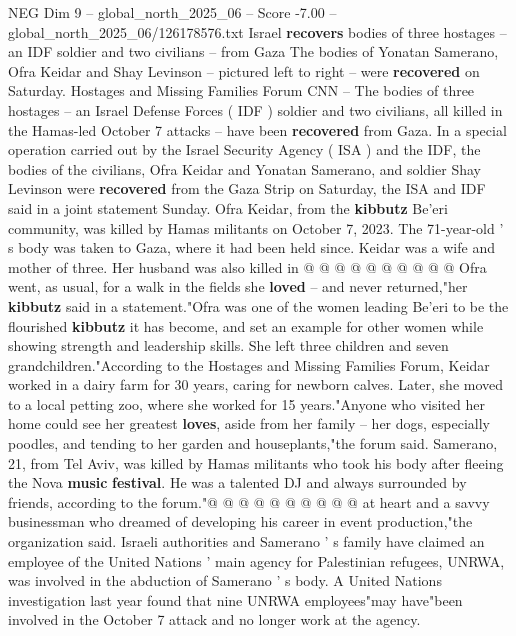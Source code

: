 \begin{textsample}{NEG Dim 9 – global\_north\_2025\_06 – Score -7.00 – global\_north\_2025\_06/126178576.txt}  \label{ex:f9_neg_095}
Israel \textbf{recovers} bodies of three hostages -- an IDF soldier and two civilians -- from Gaza The bodies of Yonatan Samerano, Ofra Keidar and Shay Levinson -- pictured left to right -- were \textbf{recovered} on Saturday.
Hostages and Missing Families Forum CNN -- The bodies of three hostages -- an Israel Defense Forces ( IDF ) soldier and two civilians, all killed in the Hamas-led October 7 attacks -- have been \textbf{recovered} from Gaza.
In a special operation carried out by the Israel Security Agency ( ISA ) and the IDF, the bodies of the civilians, Ofra Keidar and Yonatan Samerano, and soldier Shay Levinson were \textbf{recovered} from the Gaza Strip on Saturday, the ISA and IDF said in a joint statement Sunday.
Ofra Keidar, from the \textbf{kibbutz} Be'eri community, was killed by Hamas militants on October 7, 2023.
The 71-year-old ' s body was taken to Gaza, where it had been held since.
Keidar was a wife and mother of three.
Her husband was also killed in @ @ @ @ @ @ @ @ @ @ Ofra went, as usual, for a walk in the fields she \textbf{loved} -- and never returned,"her \textbf{kibbutz} said in a statement."Ofra was one of the women leading Be'eri to be the flourished \textbf{kibbutz} it has become, and set an example for other women while showing strength and leadership skills.
She left three children and seven grandchildren."According to the Hostages and Missing Families Forum, Keidar worked in a dairy farm for 30 years, caring for newborn calves.
Later, she moved to a local petting zoo, where she worked for 15 years."Anyone who visited her home could see her greatest \textbf{loves}, aside from her family -- her dogs, especially poodles, and tending to her garden and houseplants,"the forum said.
Samerano, 21, from Tel Aviv, was killed by Hamas militants who took his body after fleeing the Nova \textbf{music} \textbf{festival}.
He was a talented DJ and always surrounded by friends, according to the forum."@ @ @ @ @ @ @ @ @ @ at heart and a savvy businessman who dreamed of developing his career in event production,"the organization said.
Israeli authorities and Samerano ' s family have claimed an employee of the United Nations ' main agency for Palestinian refugees, UNRWA, was involved in the abduction of Samerano ' s body.
A United Nations investigation last year found that nine UNRWA employees"may have"been involved in the October 7 attack and no longer work at the agency.

\end{textsample}
